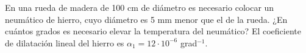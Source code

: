 
En una rueda de madera de 100 cm de diámetro es necesario colocar un neumático de hierro, cuyo diámetro es 5 mm menor que el de la rueda. ¿En cuántos grados es necesario elevar la temperatura del neumático? El coeficiente de dilatación lineal del hierro es $\alpha_1 = 12 \cdot 10^{-6}$ grad$^{-1}$.